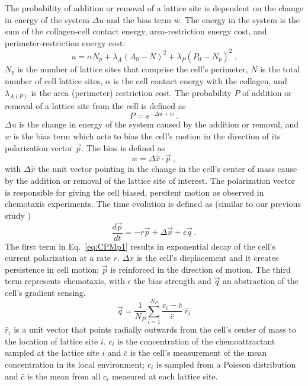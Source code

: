 The probability of addition or removal of a lattice site is dependent on the change in energy of the system $\Delta u$ and the bias term $w$. The energy in the system is the sum of the collagen-cell contact energy, area-restriction energy cost, and perimeter-restriction energy cost:
\begin{equation} \label{eq:CPMu1}
    u = \alpha N_p + \lambda_A(A_0 - N)^2 + \lambda_P(P_0 - N_p)^2 \ .
\end{equation}
$N_p$ is the number of lattice sites that comprise the cell's perimeter, $N$ is the total number of cell lattice sites, $\alpha$ is the cell contact energy with the collagen, and $\lambda_{A(P)}$ is the area (perimeter) restriction cost. The probability $P$ of addition or removal of a lattice site from the cell is defined as
\begin{equation} \label{eq:CPMprob1}
    P = e^{-\Delta u + w} \ .
\end{equation}
$\Delta u$ is the change in energy of the system caused by the addition or removal, and $w$ is the bias term which acts to bias the cell's motion in the direction of its polarization vector $\vec{p}$. The bias is defined as
\begin{equation}
    w = \Delta\hat{x} \cdot \vec{p} \ ,
\end{equation}
with $\Delta\hat{x}$ the unit vector pointing in the change in the cell's center of mass cause by the addition or removal of the lattice site of interest. The polarization vector is responsible for giving the cell biased, persitent motion as observed in chemotaxis experiments. The time evolution is defined as (similar to our previous study \red{[CITE]})
\begin{equation} \label{eq:CPMp1}
    \frac{d\vec{p}}{dt} = -r\vec{p} + \Delta\vec{x} + \epsilon \vec{q}\ .
\end{equation}
The first term in Eq.\ \ref{eq:CPMp1} results in exponential decay of the cell's current polarization at a rate $r$. $\Delta x$ is the cell's displacement and it creates persistence in cell motion; $\vec{p}$ is reinforced in the direction of motion. The third term represents chemotaxis, with $\epsilon$ the bias strength and $\vec{q}$ an abstraction of the cell's gradient sensing.
\begin{equation} \label{eq:CPMq1}
    \vec{q} = \frac{1}{N_P} \sum_{i=1}^{N_P} \frac{c_i-\bar{c}}{\bar{c}} \ \hat{r}_i
\end{equation}
$\hat{r}_i$ is a unit vector that points radially outwards from the cell's center of mass to the location of lattice site $i$. $c_i$ is the concentration of the chemoattractant sampled at the lattice site $i$ and $\bar{c}$ is the cell's measurement of the mean concentration in its local environment; $c_i$ is sampled from a Poisson distribution and $\bar{c}$ is the mean from all $c_i$ measured at each lattice site.

